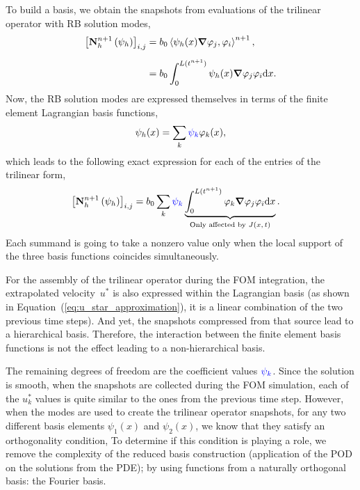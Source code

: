 \documentclass[../../thesis.tex]{subfiles}
\newcommand{\inner}[2]{\left<#1, #2\right>}
\newcommand{\Ah}[1]{\ensuremath{\vb{#1}^{n+1}_h}}
\begin{document}
To build a basis, we obtain the snapshots from evaluations 
of the trilinear operator with RB solution modes,
\begin{equation}
    \begin{split}
        \qty[\Ah{N}\left(\psi_{h}\right)]_{i,j}
        &= b_0 \inner{\psi_h(x)\grad \varphi_j}{\varphi_i}^{n+1},
        \\[2mm]
        &= b_0 \int_{0}^{L(t^{n+1})} \psi_h(x) \grad \varphi_j \varphi_i \dd x.
    \end{split}
\end{equation}
Now, the RB solution modes are expressed themselves in terms of 
the finite element Lagrangian basis functions,
\begin{equation}
    \psi_h(x) = \sum_{k} 
    \textcolor{blue}{\psi_k} 
    \varphi_{k}(x),
\end{equation}
which leads to the following exact expression for each of the entries of the trilinear form,
\begin{equation}
    \begin{split}
        \qty[\Ah{N}\left(\psi_{h}\right)]_{i,j}
        &= b_0 \sum_k 
        \textcolor{blue}{\psi_k} 
        \underbrace{\int_{0}^{L(t^{n+1})} 
        \varphi_{k} \grad \varphi_j \varphi_i \dd x}_{\text{Only affected by $J(x, t)$}}.
    \end{split}
    \label{eq:appendix_exact_representation_triliear_form}
\end{equation}
Each summand is going to take a nonzero value only when the local support of the three
basis functions coincides simultaneously.

For the assembly of the trilinear operator during the FOM integration, 
the extrapolated velocity~$u^{*}$ is also expressed within the Lagrangian basis
(as shown in Equation~(\ref{eq:u_star_approximation}), 
it is a linear combination of the two previous time steps).
And yet, the snapshots compressed from that source lead to a hierarchical basis.
Therefore, the interaction between the finite element basis functions
is not the effect leading to a non-hierarchical basis.

The remaining degrees of freedom are the coefficient values 
$\textcolor{blue}{\psi_k}$.
Since the solution is smooth,
when the snapshots are collected during the FOM simulation, 
each of the $u_k^{*}$ values is quite similar to the ones from the previous time step.
However, when the modes are used to create 
the trilinear operator snapshots, 
for any two different basis elements $\psi_1(x)$ and $\psi_2(x)$,
we know that they satisfy an orthogonality condition,
To determine if this condition is playing a role, 
we remove the complexity of the reduced basis construction 
(application of the POD on the solutions from the PDE);
by using functions from a naturally orthogonal basis:
the Fourier basis.
\end{document}
